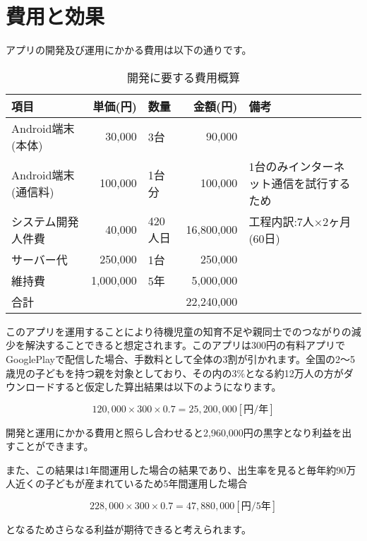 \documentclass[a4j]{jarticle}
\begin{document}
\section{費用と効果}
アプリの開発及び運用にかかる費用は以下の通りです。
　\begin{table}[htp]
\begin{center}
  \caption{開発に要する費用概算}
  \begin{tabular}{|l|r|l|r|l|}\hline
    項目& 単価(円) & 数量 & 金額(円) & 備考  \\ \hline
    Android端末(本体)& 30,000 & 3台 & 90,000 & 　 \\ \hline
    Android端末(通信料)& 100,000 & 1台分 & 100,000 & 1台のみインターネット通信を試行するため  \\ \hline
    システム開発人件費& 40,000 & 420人日 & 16,800,000 & 工程内訳:7人×2ヶ月(60日)  \\ \hline
    サーバー代& 250,000 & 1台 & 250,000 & 　 \\ \hline
    維持費& 1,000,000 & 5年 & 5,000,000 & 　　  \\ \hline
    \multicolumn{3}{|l|}{合計} & 22,240,000 &　 \\ \hline
  \end{tabular}
\end{center}
\end{table}

このアプリを運用することにより待機児童の知育不足や親同士でのつながりの減少を解決することできると想定されます。このアプリは300円の有料アプリでGooglePlayで配信した場合、手数料として全体の3割が引かれます。全国の2～5歳児の子どもを持つ親を対象としており、その内の3\%となる約12万人の方がダウンロードすると仮定した算出結果は以下のようになります。

\begin{equation}
  120,000×300×0.7 = 25,200,000 [円/年]
\end{equation}

開発と運用にかかる費用と照らし合わせると2,960,000円の黒字となり利益を出すことができます。\par
また、この結果は1年間運用した場合の結果であり、出生率を見ると毎年約90万人近くの子どもが産まれているため5年間運用した場合

\begin{equation}
  228,000×300×0.7 = 47,880,000　[円/5年]
\end{equation}

となるためさらなる利益が期待できると考えられます。
\end{document}

